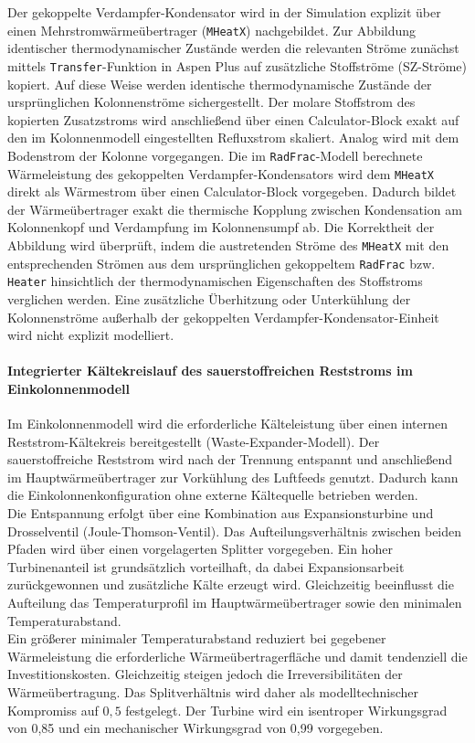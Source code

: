 Der gekoppelte Verdampfer-Kondensator wird in der Simulation explizit über einen Mehrstromwärmeübertrager (\texttt{MHeatX}) nachgebildet. Zur Abbildung identischer thermodynamischer Zustände werden die relevanten Ströme zunächst mittels \texttt{Transfer}-Funktion in Aspen Plus auf zusätzliche Stoffströme (SZ-Ströme) kopiert. Auf diese Weise werden identische thermodynamische Zustände der ursprünglichen Kolonnenströme sichergestellt. Der molare Stoffstrom des kopierten Zusatzstroms wird anschließend über einen Calculator-Block exakt auf den im Kolonnenmodell eingestellten Refluxstrom skaliert. Analog wird mit dem Bodenstrom der Kolonne vorgegangen. Die im \texttt{RadFrac}-Modell berechnete Wärmeleistung des gekoppelten Verdampfer-Kondensators wird dem \texttt{MHeatX} direkt als Wärmestrom über einen Calculator-Block vorgegeben. Dadurch bildet der Wärmeübertrager exakt die thermische Kopplung zwischen Kondensation am Kolonnenkopf und Verdampfung im Kolonnensumpf ab. Die Korrektheit der Abbildung wird überprüft, indem die austretenden Ströme des \texttt{MHeatX} mit den entsprechenden Strömen aus dem ursprünglichen gekoppeltem \texttt{RadFrac} bzw. \texttt{Heater} hinsichtlich der thermodynamischen Eigenschaften des Stoffstroms verglichen werden.
Eine zusätzliche Überhitzung oder Unterkühlung der Kolonnenströme außerhalb der gekoppelten Verdampfer-Kondensator-Einheit wird nicht explizit modelliert.

\paragraph{Integrierter Kältekreislauf des sauerstoffreichen Reststroms im Einkolonnenmodell}
\label{sec:modell_loop} Im Einkolonnenmodell wird die erforderliche Kälteleistung über einen internen
Reststrom-Kältekreis bereitgestellt (Waste-Expander-Modell). Der sauerstoffreiche
Reststrom wird nach der Trennung entspannt und anschließend im
Hauptwärmeübertrager zur Vorkühlung des Luftfeeds genutzt. Dadurch kann die
Einkolonnenkonfiguration ohne externe Kältequelle betrieben werden.\\
Die Entspannung erfolgt über eine Kombination aus Expansionsturbine und
Drosselventil (Joule-Thomson-Ventil). Das Aufteilungsverhältnis zwischen beiden
Pfaden wird über einen vorgelagerten Splitter vorgegeben. Ein hoher
Turbinenanteil ist grundsätzlich vorteilhaft, da dabei Expansionsarbeit
zurückgewonnen und zusätzliche Kälte erzeugt wird. Gleichzeitig beeinflusst die
Aufteilung das Temperaturprofil im Hauptwärmeübertrager sowie den minimalen
Temperaturabstand.\\
Ein größerer minimaler Temperaturabstand reduziert bei gegebener Wärmeleistung
die erforderliche Wärmeübertragerfläche und damit tendenziell die
Investitionskosten. Gleichzeitig steigen jedoch die Irreversibilitäten der
Wärmeübertragung. Das Splitverhältnis wird daher als modelltechnischer
Kompromiss auf \(0{,}5\) festgelegt. Der Turbine wird ein isentroper Wirkungsgrad von 0,85 und ein mechanischer Wirkungsgrad von 0,99 vorgegeben.

